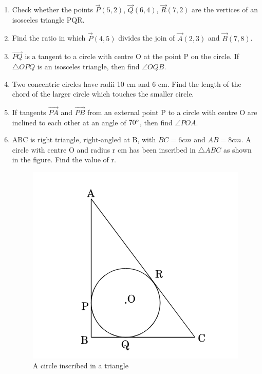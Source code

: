 \documentclass{article}
\begin{document}
\begin{enumerate}
\item Check whether the points $\vec{P}(5, 2)$, $\vec{Q}(6, 4)$, $\vec{R}(7, 2)$ are the vertices of an isosceles triangle PQR.

\item Find the ratio in which $\vec{P}(4, 5)$ divides the join of $\vec{A}(2, 3)$ and $\vec{B}(7, 8)$. 
	
\item $ \vec{PQ} $ is a tangent to a circle with centre O at the point P on the circle. If $\triangle OPQ$ is an isosceles triangle, then find $\angle OQB$. 

\item Two concentric circles have radii 10 cm and 6 cm. Find the length of the chord of the larger circle which touches the smaller circle. 

\item If tangents $ \vec{PA} $ and $ \vec{PB} $ from an external point P to a circle with centre O are inclined to each other at an angle of $70\degree$, then find $\angle POA$. 

\item ABC is right triangle, right-angled at B, with $BC = 6 cm$ and $AB = 8 cm$. A circle with centre O and radius r cm has been inscribed in $\triangle ABC$ as shown in the figure. Find the value of r. 
	\begin{figure}[h]
	\centering
	\includegraphics[width=\columnwidth]{figs/3.jpg}
	\caption{A circle inscribed in a triangle}
	\label{fig:3}
	\end{figure}
	

\end{enumerate}
\end{document}
